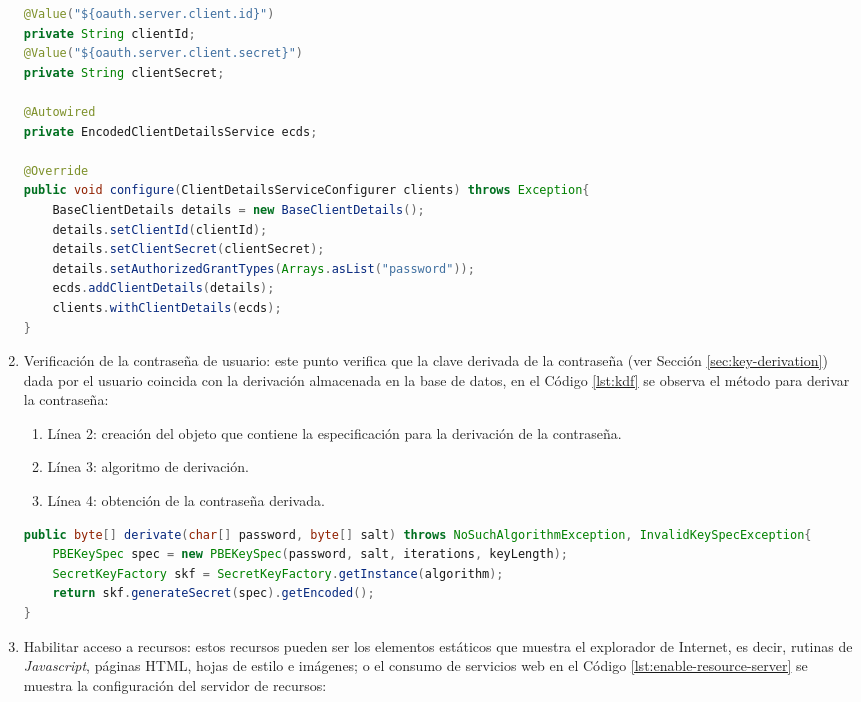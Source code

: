 \begin{enumerate}
\begin{lstlisting}[language=Java, caption={Clase de autentificación de cliente.}, captionpos=b, label={lst:client-auth}]
@Value("${oauth.server.client.id}")
private String clientId;
@Value("${oauth.server.client.secret}")
private String clientSecret;

@Autowired
private EncodedClientDetailsService ecds;

@Override
public void configure(ClientDetailsServiceConfigurer clients) throws Exception{
	BaseClientDetails details = new BaseClientDetails();
	details.setClientId(clientId);
	details.setClientSecret(clientSecret);
	details.setAuthorizedGrantTypes(Arrays.asList("password"));
	ecds.addClientDetails(details);
	clients.withClientDetails(ecds);
}
\end{lstlisting}

	\item Verificación de la contraseña de usuario: este punto verifica que la clave derivada de la contraseña (ver Sección \ref{sec:key-derivation}) dada por el usuario coincida con la derivación almacenada en la base de datos, en el Código \ref{lst:kdf} se observa el método para derivar la contraseña:
	\begin{enumerate}
		\item Línea 2: creación del objeto que contiene la especificación para la derivación de la contraseña.
		\item Línea 3: algoritmo de derivación.
		\item Línea 4: obtención de la contraseña derivada.
	\end{enumerate}
\begin{lstlisting}[language=Java, caption={Derivación de la constraseña de usuario.}, captionpos=b, label={lst:kdf}]
public byte[] derivate(char[] password, byte[] salt) throws NoSuchAlgorithmException, InvalidKeySpecException{
	PBEKeySpec spec = new PBEKeySpec(password, salt, iterations, keyLength);
	SecretKeyFactory skf = SecretKeyFactory.getInstance(algorithm);
	return skf.generateSecret(spec).getEncoded();
}
\end{lstlisting}


	\item Habilitar acceso a recursos: estos recursos pueden ser los elementos estáticos que muestra el explorador de Internet, es decir, rutinas de \textit{Javascript}, páginas HTML, hojas de estilo e imágenes; o el consumo de servicios web en el Código \ref{lst:enable-resource-server} se muestra la configuración del servidor de recursos:


\end{enumerate}
